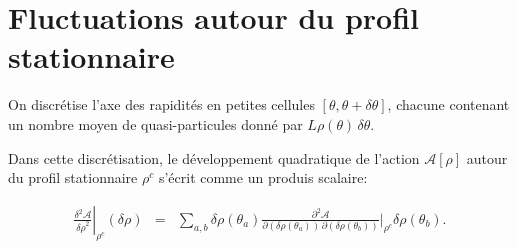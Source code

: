 %					
			

		
			



\section{Fluctuations autour du profil stationnaire}


On discrétise l’axe des rapidités en petites cellules \( [\theta, \theta + \delta\theta] \), chacune contenant un nombre moyen de quasi-particules donné par \( L \rho(\theta) \, \delta\theta \).%

Dans cette discrétisation, le développement quadratique de l’action \( \mathcal{A}[\rho] \) autour du profil stationnaire \( \rho^c \) s’écrit comme un produis scalaire:

\begin{eqnarray*}
    \left. \frac{\delta^2 \mathcal{A}}{{\delta \rho}^2} \right|_{\rho^c}(\delta \rho )  &= &  
    \sum_{a,b} \delta \rho(\theta_a)  
    \frac{\partial^2 \mathcal{A}}{\partial (\delta \rho(\theta_a)) \, \partial (\delta \rho(\theta_b))} \Big|_{\rho^c} 
    \delta \rho(\theta_b).
\end{eqnarray*}


